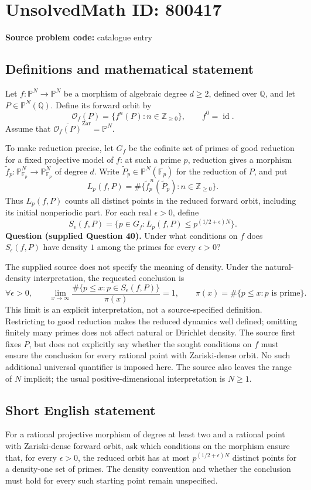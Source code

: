 \documentclass[11pt]{article}
\newcommand{\Z}{\mathbb{Z}}
\newcommand{\Q}{\mathbb{Q}}
\newcommand{\F}{\mathbb{F}}
\newcommand{\PP}{\mathbb{P}}
\begin{document}
\section*{UnsolvedMath ID: 800417}
\textbf{Source problem code:} catalogue entry
\subsection{Definitions and mathematical statement}
Let \(f:\PP^N\to\PP^N\) be a morphism of algebraic degree \(d\ge 2\), defined over \(\Q\), and let \(P\in\PP^N(\Q)\). Define its forward orbit by
\[
\mathcal O_f(P)=\{f^n(P):n\in\Z_{\ge0}\},\qquad f^0=\operatorname{id}.
\]
Assume that \(\overline{\mathcal O_f(P)}^{\mathrm{Zar}}=\PP^N\).

To make reduction precise, let \(G_f\) be the cofinite set of primes of good reduction for a fixed projective model of \(f\): at such a prime \(p\), reduction gives a morphism \(\widetilde f_p:\PP^N_{\F_p}\to\PP^N_{\F_p}\) of degree \(d\). Write \(\widetilde P_p\in\PP^N(\F_p)\) for the reduction of \(P\), and put
\[
L_p(f,P)=\#\{\widetilde f_p^{\,n}(\widetilde P_p):n\in\Z_{\ge0}\}.
\]
Thus \(L_p(f,P)\) counts all distinct points in the reduced forward orbit, including its initial nonperiodic part. For each real \(\epsilon>0\), define
\[
S_\epsilon(f,P)=\bigl\{p\in G_f:L_p(f,P)\le p^{(1/2+\epsilon)N}\bigr\}.
\]
\textbf{Question (supplied Question 40).} Under what conditions on \(f\) does \(S_\epsilon(f,P)\) have density \(1\) among the primes for every \(\epsilon>0\)?

The supplied source does not specify the meaning of density. Under the natural-density interpretation, the requested conclusion is
\[
\forall\epsilon>0,\qquad
\lim_{x\to\infty}
\frac{\#\{p\le x:p\in S_\epsilon(f,P)\}}{\pi(x)}=1,
\qquad \pi(x)=\#\{p\le x:p\text{ is prime}\}.
\]
This limit is an explicit interpretation, not a source-specified definition. Restricting to good reduction makes the reduced dynamics well defined; omitting finitely many primes does not affect natural or Dirichlet density. The source first fixes \(P\), but does not explicitly say whether the sought conditions on \(f\) must ensure the conclusion for every rational point with Zariski-dense orbit. No such additional universal quantifier is imposed here. The source also leaves the range of \(N\) implicit; the usual positive-dimensional interpretation is \(N\ge1\).
\subsection{Short English statement}
For a rational projective morphism of degree at least two and a rational point with Zariski-dense forward orbit, ask which conditions on the morphism ensure that, for every \(\epsilon>0\), the reduced orbit has at most \(p^{(1/2+\epsilon)N}\) distinct points for a density-one set of primes. The density convention and whether the conclusion must hold for every such starting point remain unspecified.
\end{document}

